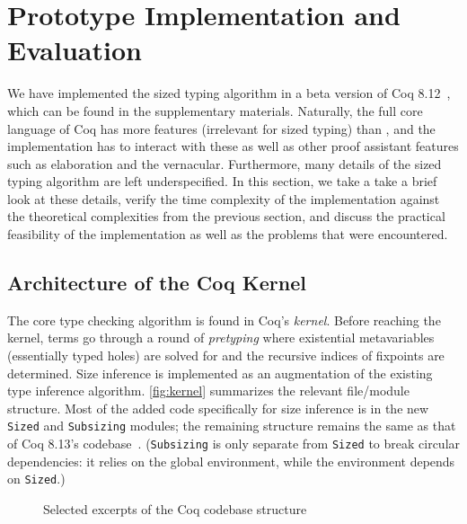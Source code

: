 \section{Prototype Implementation and Evaluation} \label{sec:impl}

We have implemented the sized typing algorithm in a beta version of Coq 8.12~\citep{impl},
which can be found in the supplementary materials.
Naturally, the full core language of Coq has more features (irrelevant for sized typing) than \lang,
and the implementation has to interact with these as well as other proof assistant features such as elaboration and the vernacular.
Furthermore, many details of the sized typing algorithm are left underspecified.
In this section, we take a take a brief look at these details,
verify the time complexity of the implementation against the theoretical complexities from the previous section,
and discuss the practical feasibility of the implementation as well as the problems that were encountered.

\subsection{Architecture of the Coq Kernel}

The core type checking algorithm is found in Coq's \emph{kernel}.
Before reaching the kernel, terms go through a round of \emph{pretyping}
where existential metavariables (essentially typed holes) are solved for
and the recursive indices of fixpoints are determined.
Size inference is implemented as an augmentation of the existing type inference algorithm.
\autoref{fig:kernel} summarizes the relevant file/module structure.
Most of the added code specifically for size inference is in the new \texttt{Sized} and \texttt{Subsizing} modules;
the remaining structure remains the same as that of Coq 8.13's codebase~\citep{coq}.
(\texttt{Subsizing} is only separate from \texttt{Sized} to break circular dependencies: it relies on the global environment, while the environment depends on \texttt{Sized}.)

\begin{figure}
\caption{Selected excerpts of the Coq codebase structure}
\label{fig:kernel}
\end{figure}

